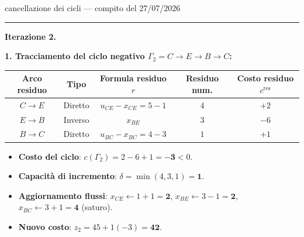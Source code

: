 \documentclass[11pt,a4paper]{article}
\newcommand{\mcfnodes}{%
  \node[nd] (A) at (0,2.1) {$A$};
  \node[nd] (B) at (0,-2.1) {$B$};
  \node[nd] (C) at (3.0,0) {$C$};
  \node[nd] (D) at (6.0,2.1) {$D$};
  \node[nd] (E) at (6.0,-2.1) {$E$};}
\newcommand{\ra}[4]{\draw[#1,thick,black!65] (#2) -- node[font=\scriptsize,black!70,fill=amber!5,inner sep=1pt]{$#4$} (#3);}
\newcommand{\cy}[3]{\draw[->,line width=1.2pt,crimson] (#1) to[bend left=16] node[font=\scriptsize,crimson,fill=amber!5,inner sep=1pt]{$#3$} (#2);}
\newcommand{\fa}[4]{\draw[->,thick,black!45] (#1) -- node[font=\scriptsize,black!55,sloped,above,inner sep=1.5pt]{$#3$} node[font=\small,teal,sloped,below,inner sep=1.5pt]{$\mathbf{#4}$} (#2);}
\begin{document}
\begin{es}{cancellazione dei cicli --- compito del 27/07/2026}
\medskip
\hrule
\medskip

\textbf{Iterazione 2.}

\textbf{1. Tracciamento del ciclo negativo $\Gamma_2 = C \to E \to B \to C$:}
\begin{center}
\small
\begin{tabular}{@{}ccccc@{}}
\toprule
\textbf{Arco residuo} & \textbf{Tipo} & \textbf{Formula residuo $r$} & \textbf{Residuo num.} & \textbf{Costo residuo $c^{\text{res}}$}\\
\midrule
$C \to E$ & Diretto & $u_{CE} - x_{CE} = 5 - 1$ & $4$ & $+2$\\
$E \to B$ & Inverso & $x_{BE}$ & $3$ & $-6$\\
$B \to C$ & Diretto & $u_{BC} - x_{BC} = 4 - 3$ & $1$ & $+1$\\
\bottomrule
\end{tabular}
\end{center}
\begin{itemize}[itemsep=0.15em]
\item \textbf{Costo del ciclo}: $c(\Gamma_2) = 2 - 6 + 1 = \mathbf{-3} < 0$.
\item \textbf{Capacità di incremento}: $\delta = \min(4, 3, 1) = \mathbf{1}$.
\item \textbf{Aggiornamento flussi}:
  $x_{CE} \leftarrow 1 + 1 = \mathbf{2}$, \quad
  $x_{BE} \leftarrow 3 - 1 = \mathbf{2}$, \quad
  $x_{BC} \leftarrow 3 + 1 = \mathbf{4}$ (saturo).
\item \textbf{Nuovo costo}: $z_2 = 45 + 1(-3) = \mathbf{42}$.
\end{itemize}

\begin{center}
\begin{minipage}[t]{0.48\textwidth}\centering
{}
\par\vspace{1mm}{\scriptsize $G_x$ post it. 1: evidenziato $\Gamma_2$ ($c=-3$, $\delta=1$)}
\end{minipage}\hfill
\begin{minipage}[t]{0.48\textwidth}\centering
{}
\par\vspace{1mm}{\scriptsize $G$ dopo iterazione 2 (costo $42$)}
\end{minipage}
\end{center}


\end{es}
\end{document}

